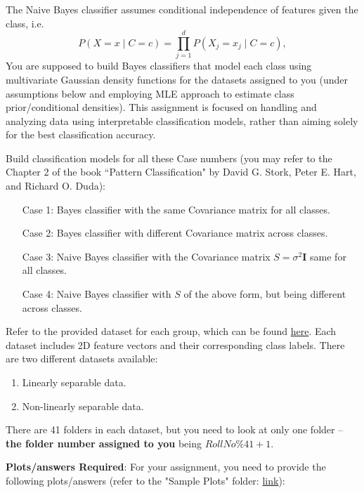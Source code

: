 \documentclass[solution,addpoints,12pt]{exam}
\begin{document}
\begin{questions}
The Naive Bayes classifier assumes conditional independence of features given the class, i.e. 
\[
P(X=x \mid C=c) = \prod_{j=1}^d P(X_j = x_j \mid C=c),
\]
You are supposed to build Bayes classifiers that model each class using multivariate Gaussian density functions for the datasets assigned to you (under assumptions below and employing MLE approach to estimate class prior/conditional densities). This assignment is focused on handling and analyzing data using interpretable classification models, rather than aiming solely for the best classification accuracy. 
    
Build classification models for all these Case numbers (you may refer to the Chapter 2 of the book ``Pattern Classification" by David G. Stork, Peter E. Hart, and Richard O. Duda):
\begin{enumerate}
    \item[Case 1:] Bayes classifier with the same Covariance matrix for all classes.
    \item[Case 2:] Bayes classifier with different Covariance matrix across classes.
    \item[Case 3:] Naive Bayes classifier with the Covariance matrix $S = \sigma^2 \mathbf{I}$ same for all classes.
    \item[Case 4:] Naive Bayes classifier with $S$ of the above form, but being different across classes.
\end{enumerate}
    
Refer to the provided dataset for each group, which can be found  \href{https://drive.google.com/drive/folders/1YwSDijf-LOF3HZwSBoMc5R02TH_o12s3?usp=sharing}{here}. Each dataset includes 2D feature vectors and their corresponding class labels. There are two different datasets available:
\begin{enumerate}
    \item Linearly separable data.
    \item Non-linearly separable data.
\end{enumerate}
There are 41 folders in each dataset, but you need to look at only one folder -- {\bf the folder number assigned to you} being $RollNo\%41 + 1$.
    
\textbf{Plots/answers Required}:
For your assignment, you need to provide the following plots/answers (refer to the "Sample Plots" folder: \href{https://drive.google.com/drive/folders/1YwSDijf-LOF3HZwSBoMc5R02TH_o12s3?usp=sharing}{link}):
    
\end{questions}
\end{document}

